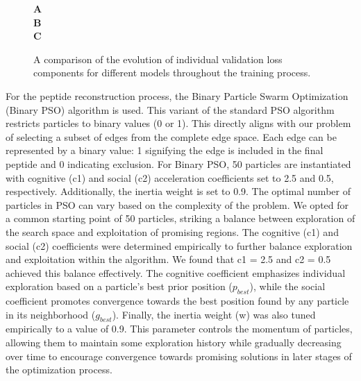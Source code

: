 \begin{figure}
  \center

  \textbf{\Large A}
   \\

  \textbf{\Large B}
   \\

  \textbf{\Large C}

  \caption{A comparison of the evolution of individual validation loss components for different models throughout the training process.}

  \label{fig:cmp_val_metrics}
\end{figure}

For the peptide reconstruction process, the Binary Particle Swarm Optimization (Binary PSO) algorithm is used. This variant of the standard PSO algorithm restricts particles to binary values (0 or 1). This directly aligns with our problem of selecting a subset of edges from the complete edge space. Each edge can be represented by a binary value: 1 signifying the edge is included in the final peptide and 0 indicating exclusion. For Binary PSO, 50 particles are instantiated with cognitive (c1) and social (c2) acceleration coefficients set to 2.5 and 0.5, respectively. Additionally, the inertia weight is set to 0.9.
The optimal number of particles in PSO can vary based on the complexity of the problem. We opted for a common starting point of 50 particles, striking a balance between exploration of the search space and exploitation of promising regions. The cognitive (c1) and social (c2) coefficients were determined empirically to further balance exploration and exploitation within the algorithm. We found that c1 = 2.5 and c2 = 0.5 achieved this balance effectively. The cognitive coefficient emphasizes individual exploration based on a particle's best prior position ($p_{best}$), while the social coefficient promotes convergence towards the best position found by any particle in its neighborhood ($g_{best}$). Finally, the inertia weight (w) was also tuned empirically to a value of 0.9. This parameter controls the momentum of particles, allowing them to maintain some exploration history while gradually decreasing over time to encourage convergence towards promising solutions in later stages of the optimization process.

